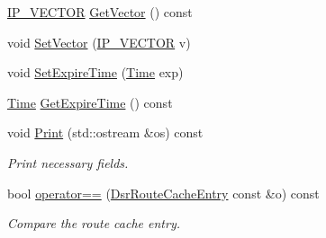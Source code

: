 \begin{DoxyCompactItemize}
\item 
\hyperlink{classns3_1_1dsr_1_1DsrRouteCacheEntry_ab834177006bdbfd2e3fa607c2a88cbdf}{I\+P\+\_\+\+V\+E\+C\+T\+OR} \hyperlink{classns3_1_1dsr_1_1DsrRouteCacheEntry_ae4da0e5291ffddc5ea66df0a8085bb6c}{Get\+Vector} () const 
\item 
void \hyperlink{classns3_1_1dsr_1_1DsrRouteCacheEntry_ad3c9454ad9b4751f612776492533cef2}{Set\+Vector} (\hyperlink{classns3_1_1dsr_1_1DsrRouteCacheEntry_ab834177006bdbfd2e3fa607c2a88cbdf}{I\+P\+\_\+\+V\+E\+C\+T\+OR} v)
\item 
void \hyperlink{classns3_1_1dsr_1_1DsrRouteCacheEntry_ac9a2464c737c85814a9d76219c8eab37}{Set\+Expire\+Time} (\hyperlink{classns3_1_1Time}{Time} exp)
\item 
\hyperlink{classns3_1_1Time}{Time} \hyperlink{classns3_1_1dsr_1_1DsrRouteCacheEntry_ab78748f3694b63ee45a15a4e3e8436d1}{Get\+Expire\+Time} () const 
\item 
void \hyperlink{classns3_1_1dsr_1_1DsrRouteCacheEntry_a52226675288af76fd25e658722673892}{Print} (std\+::ostream \&os) const 
\begin{DoxyCompactList}\small\item\em Print necessary fields. \end{DoxyCompactList}\item 
bool \hyperlink{classns3_1_1dsr_1_1DsrRouteCacheEntry_a86d4fc91d00811081846690ec5b9a20b}{operator==} (\hyperlink{classns3_1_1dsr_1_1DsrRouteCacheEntry}{Dsr\+Route\+Cache\+Entry} const \&o) const 
\begin{DoxyCompactList}\small\item\em Compare the route cache entry. \end{DoxyCompactList}\end{DoxyCompactItemize}
